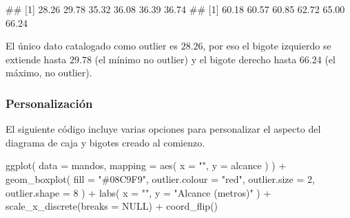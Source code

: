 \documentclass[
  title=normal,
  notoc,
  nobib,
  degree=mecinf]{mnye}
\newenvironment{Shaded}{\begin{snugshade}}{\end{snugshade}}
\newcommand{\AttributeTok}[1]{\textcolor[rgb]{0.77,0.63,0.00}{#1}}
\newcommand{\ConstantTok}[1]{\textcolor[rgb]{0.00,0.00,0.00}{#1}}
\newcommand{\DecValTok}[1]{\textcolor[rgb]{0.00,0.00,0.81}{#1}}
\newcommand{\FunctionTok}[1]{\textcolor[rgb]{0.00,0.00,0.00}{#1}}
\newcommand{\NormalTok}[1]{#1}
\newcommand{\OtherTok}[1]{\textcolor[rgb]{0.56,0.35,0.01}{#1}}
\newcommand{\SpecialCharTok}[1]{\textcolor[rgb]{0.00,0.00,0.00}{#1}}
\newcommand{\StringTok}[1]{\textcolor[rgb]{0.31,0.60,0.02}{#1}}
\begin{document}
\begin{Shaded}
\end{Shaded}

\begin{Shaded}
\begin{Highlighting}[]
\NormalTok{\#\# [1] 28.26 29.78 35.32 36.08 36.39 36.74}
\NormalTok{\#\# [1] 60.18 60.57 60.85 62.72 65.00 66.24}
\end{Highlighting}
\end{Shaded}

El único dato catalogado como outlier es \(28.26\), por eso el bigote izquierdo se extiende hasta \(29.78\) (el mínimo no outlier) y el bigote derecho hasta \(66.24\) (el máximo, no outlier).

\hypertarget{personalizaciuxf3n}{%
\subsubsection{Personalización}\label{personalizaciuxf3n}}

El siguiente código incluye varias opciones para personalizar el aspecto del diagrama de caja y bigotes creado al comienzo.

\begin{Shaded}
\begin{Highlighting}[]
\FunctionTok{ggplot}\NormalTok{(}
  \AttributeTok{data =}\NormalTok{ mandos,}
  \AttributeTok{mapping =} \FunctionTok{aes}\NormalTok{(}
    \AttributeTok{x =} \StringTok{""}\NormalTok{,}
    \AttributeTok{y =}\NormalTok{ alcance}
\NormalTok{  )}
\NormalTok{) }\SpecialCharTok{+}
  \FunctionTok{geom\_boxplot}\NormalTok{(}
    \AttributeTok{fill =} \StringTok{"\#08C9F9"}\NormalTok{,}
    \AttributeTok{outlier.colour =} \StringTok{"red"}\NormalTok{,}
    \AttributeTok{outlier.size =} \DecValTok{2}\NormalTok{,}
    \AttributeTok{outlier.shape =} \DecValTok{8}
\NormalTok{  ) }\SpecialCharTok{+}
  \FunctionTok{labs}\NormalTok{(}
    \AttributeTok{x =} \StringTok{""}\NormalTok{,}
    \AttributeTok{y =} \StringTok{"Alcance (metros)"}
\NormalTok{  ) }\SpecialCharTok{+}
  \FunctionTok{scale\_x\_discrete}\NormalTok{(}\AttributeTok{breaks =} \ConstantTok{NULL}\NormalTok{) }\SpecialCharTok{+}
  \FunctionTok{coord\_flip}\NormalTok{()}
\end{Highlighting}
\end{Shaded}
\end{document}
